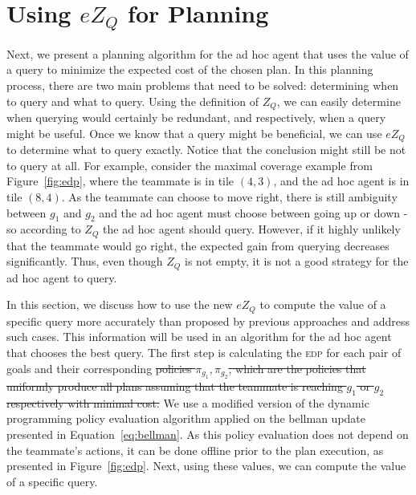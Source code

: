 \documentclass[letterpaper]{article}
\providecommand{\DIFaddtex}[1]{{\protect\color{blue}\uwave{#1}}} %
\providecommand{\DIFdeltex}[1]{{\protect\color{red}\sout{#1}}}                      %
\providecommand{\DIFaddbegin}{} %
\providecommand{\DIFaddend}{} %
\providecommand{\DIFdelbegin}{} %
\providecommand{\DIFdelend}{} %
\providecommand{\DIFadd}[1]{\texorpdfstring{\DIFaddtex{#1}}{#1}} %
\providecommand{\DIFdel}[1]{\texorpdfstring{\DIFdeltex{#1}}{}} %
\newcommand{\DIFscaledelfig}{0.5}
\newlength{\DIFdelgraphicswidth} %
\newlength{\DIFdelgraphicsheight} %
\newcommand{\DIFaddincludegraphics}[2][]{{\color{blue}\fbox{\DIFOincludegraphics[#1]{#2}}}} %
\newcommand{\DIFdelincludegraphics}[2][]{%
\sbox{\DIFdelgraphicsbox}{\DIFOincludegraphics[#1]{#2}}%
\settoboxwidth{\DIFdelgraphicswidth}{\DIFdelgraphicsbox} %
\settoboxtotalheight{\DIFdelgraphicsheight}{\DIFdelgraphicsbox} %
\scalebox{\DIFscaledelfig}{%
\parbox[b]{\DIFdelgraphicswidth}{\usebox{\DIFdelgraphicsbox}\\[-\baselineskip] \rule{\DIFdelgraphicswidth}{0em}}\llap{\resizebox{\DIFdelgraphicswidth}{\DIFdelgraphicsheight}{%
\setlength{\unitlength}{\DIFdelgraphicswidth}%
\begin{picture}(1,1)%
\thicklines\linethickness{2pt} %
{\color[rgb]{1,0,0}\put(0,0){\framebox(1,1){}}}%
{\color[rgb]{1,0,0}\put(0,0){\line( 1,1){1}}}%
{\color[rgb]{1,0,0}\put(0,1){\line(1,-1){1}}}%
\end{picture}%
}\hspace*{3pt}}} %
} %
\DeclareRobustCommand{\DIFaddbegin}{\DIFOaddbegin \let\includegraphics\DIFaddincludegraphics} %
\DeclareRobustCommand{\DIFaddend}{\DIFOaddend \let\includegraphics\DIFOincludegraphics} %
\DeclareRobustCommand{\DIFdelbegin}{\DIFOdelbegin \let\includegraphics\DIFdelincludegraphics} %
\DeclareRobustCommand{\DIFdelend}{\DIFOaddend \let\includegraphics\DIFOincludegraphics} %
\begin{document}
\section{Using $eZ_Q$ for Planning}
\label{sec:alg}
Next, we present a planning algorithm for the ad hoc agent that uses the value of a query to minimize the expected cost of the chosen plan. In this planning process, there are two main problems that need to be solved: determining when to query and what to query. Using the definition of $Z_Q$, we can easily determine when querying would certainly be redundant, and respectively, when a query might be useful. Once we know that a query might be beneficial, we can use $eZ_Q$ to determine what to query exactly. Notice that the conclusion might still be not to query at all. For example, consider the maximal coverage example from Figure~\ref{fig:edp}, where the teammate is in tile $(4,3)$, and the ad hoc agent is in tile $(8,4)$. As the teammate can choose to move right, there is still ambiguity between $g_1$ and $g_2$ and the ad hoc agent must choose between going up or down - so according to $Z_Q$ the ad hoc agent should query. However, if it highly unlikely that the teammate would go right, the expected gain from querying decreases significantly. Thus, even though $Z_Q$ is not empty, it is not a good strategy for the ad hoc agent to query. %

In this section, we discuss how to use the new $eZ_Q$ to compute the value of a specific query more accurately than proposed by previous approaches and address such cases. This information will be used in an algorithm for the ad hoc agent that chooses the best query. %
The first step is calculating the \textsc{edp} for each pair of goals and their corresponding \DIFdelbegin \DIFdel{policies $\pi_{g_1}, \pi_{g_2}$, which are the policies that uniformly produce all plans assuming that the teammate is reaching $g_1$ or  $g_2$ respectively with minimal cost. }\DIFdelend \DIFaddbegin \textsc{\DIFadd{UROP}}\DIFadd{s $\hat{\pi}_{g_1}$ and $\hat{\pi}_{g_2}$. %
}\DIFaddend %
We use a modified version of the dynamic programming policy evaluation algorithm \cite{bellman19571957} applied on the bellman update presented in Equation~\ref{eq:bellman}. 
As this policy evaluation does not depend on the teammate's actions, it can be done offline prior to the plan execution, as presented in Figure~\ref{fig:edp}. Next, using these values, we can compute the value of a specific query.
\end{document}
